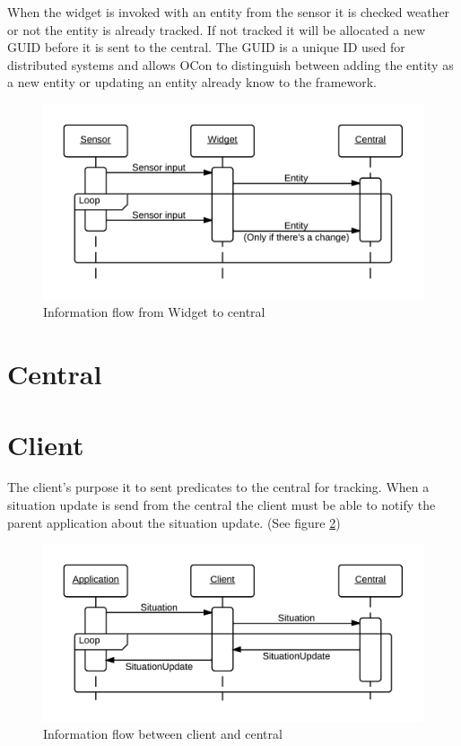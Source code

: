 \documentclass[../report.tex]{subfiles}
\begin{document}
When the widget is invoked with an entity from the sensor it is checked weather or not the entity is already tracked. If not tracked it will be allocated a new GUID before it is sent to the central. The GUID is a unique ID used for distributed systems and allows OCon to distinguish between adding the entity as a new entity or updating an entity already know to the framework.

\begin{figure}[h]
\centering
\includegraphics[width=\linewidth]{sequencediagram-widget.png}
\caption{Information flow from Widget to central}
\label{seqwidget}
\end{figure}


\section{Central}

\section{Client}

The client's purpose it to sent predicates to the central for tracking. When a situation update is send from the central the client must be able to notify the parent application about the situation update. (See figure \ref{seqclient})

\begin{figure}[h]
\centering
\includegraphics[width=\linewidth]{clientsequencediagram.png}
\caption{Information flow between client and central}
\label{seqclient}
\end{figure}
\end{document}
